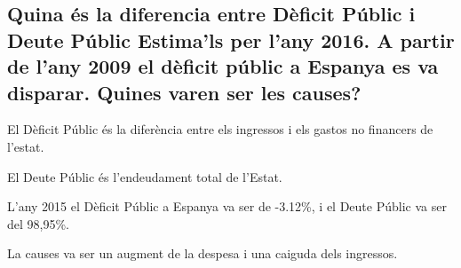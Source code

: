 \subsection{Quina és la diferencia entre Dèficit Públic i Deute Públic
Estima’ls per l’any 2016. A partir de l’any 2009 el dèficit públic a
Espanya es va disparar. Quines varen ser les causes?}

El Dèficit Públic és la diferència entre els ingressos i els gastos 
no financers de l'estat.

El Deute Públic és l'endeudament total de l'Estat.

L'any 2015 el Dèficit Públic a Espanya va ser de -3.12\%, i el 
Deute Públic va ser del 98,95\%.

La causes va ser un augment de la despesa i una caiguda dels ingressos.

